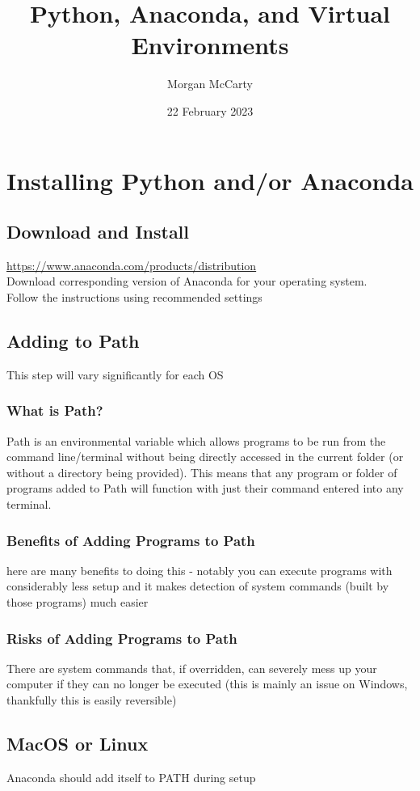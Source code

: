 \documentclass[12pt]{article}
\title{Python, Anaconda, and Virtual Environments}
\author{Morgan McCarty}
\date{22 February 2023}
\begin{document}
    \maketitle

    \section{Installing Python and/or Anaconda}
        \subsection{Download and Install}
            \url{https://www.anaconda.com/products/distribution}\\Download corresponding version of Anaconda for your operating system.
            \\Follow the instructions using recommended settings
        \subsection{Adding to Path}
            This step will vary significantly for each OS
            \subsubsection{What is Path?}
                Path is an environmental variable which allows programs to be run from the command line/terminal without being directly accessed in the current folder (or without a directory being provided).
                This means that any program or folder of programs added to Path will function with just their command entered into any terminal.
            \subsubsection{Benefits of Adding Programs to Path}
                here are many benefits to doing this - notably you can execute programs with considerably less setup and it makes detection of system commands
                (built by those programs) much easier
            \subsubsection{Risks of Adding Programs to Path}
                There are system commands that, if overridden, can severely mess up your computer if they can no longer be executed 
                (this is mainly an issue on Windows, thankfully this is easily reversible)
        \subsection{MacOS or Linux}
            Anaconda should add itself to PATH during setup
\end{document}

